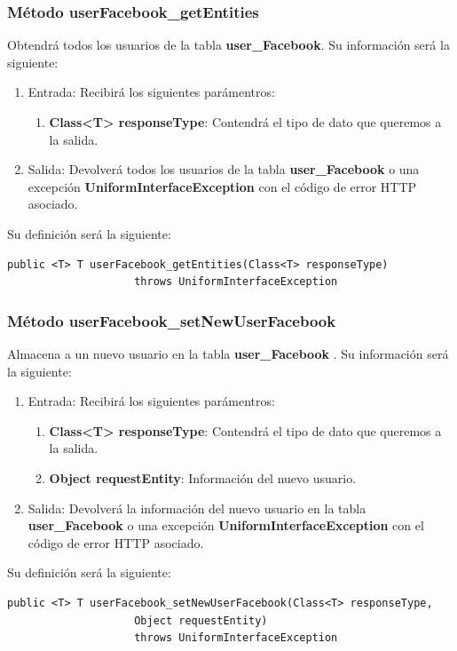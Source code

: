 \subsubsection{Método userFacebook\_getEntities}
Obtendrá todos los usuarios de la tabla \textbf{user\_Facebook}. Su información será la siguiente:
\begin{enumerate}
\item Entrada: Recibirá los siguientes parámentros:
\begin{enumerate}
\item \textbf{Class<T> responseType}: Contendrá el tipo de dato que queremos a la salida. 
\end{enumerate}
\item Salida: Devolverá todos los usuarios de la tabla \textbf{user\_Facebook} o una excepción \textbf{UniformInterfaceException} con el código de error HTTP asociado.
\end{enumerate}
\bigskip
\par
Su definición será la siguiente:
\begin{verbatim}public <T> T userFacebook_getEntities(Class<T> responseType) 
					throws UniformInterfaceException\end{verbatim}

\subsubsection{Método userFacebook\_setNewUserFacebook}
Almacena a un nuevo usuario en la tabla \textbf{user\_Facebook} . Su información será la siguiente:
\begin{enumerate}
\item Entrada: Recibirá los siguientes parámentros:
\begin{enumerate}
\item \textbf{Class<T> responseType}: Contendrá el tipo de dato que queremos a la salida. 
\item \textbf{Object requestEntity}: Información del nuevo usuario.
\end{enumerate}
\item Salida: Devolverá la información del nuevo usuario en la tabla \textbf{user\_Facebook} o una excepción \textbf{UniformInterfaceException} con el código de error HTTP asociado.
\end{enumerate}
\bigskip
\par
Su definición será la siguiente:
\begin{verbatim}public <T> T userFacebook_setNewUserFacebook(Class<T> responseType, 
					Object requestEntity) 
					throws UniformInterfaceException\end{verbatim}

